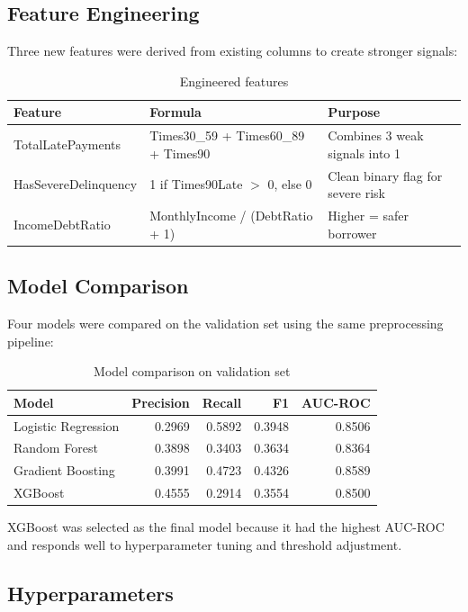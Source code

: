 \documentclass[12pt, a4paper]{article}
\begin{document}
\subsection{Feature Engineering}

Three new features were derived from existing columns to create stronger signals:

\begin{table}[H]
\centering
\begin{tabular}{lll}
\toprule
\textbf{Feature} & \textbf{Formula} & \textbf{Purpose} \\
\midrule
TotalLatePayments & Times30\_59 + Times60\_89 + Times90 & Combines 3 weak signals into 1 \\
HasSevereDelinquency & 1 if Times90Late $>$ 0, else 0 & Clean binary flag for severe risk \\
IncomeDebtRatio & MonthlyIncome / (DebtRatio + 1) & Higher = safer borrower \\
\bottomrule
\end{tabular}
\caption{Engineered features}
\end{table}

\subsection{Model Comparison}

Four models were compared on the validation set using the same preprocessing pipeline:

\begin{table}[H]
\centering
\begin{tabular}{lrrrr}
\toprule
\textbf{Model} & \textbf{Precision} & \textbf{Recall} & \textbf{F1} & \textbf{AUC-ROC} \\
\midrule
Logistic Regression & 0.2969 & 0.5892 & 0.3948 & 0.8506 \\
Random Forest & 0.3898 & 0.3403 & 0.3634 & 0.8364 \\
Gradient Boosting & 0.3991 & 0.4723 & 0.4326 & 0.8589 \\
XGBoost & 0.4555 & 0.2914 & 0.3554 & 0.8500 \\
\bottomrule
\end{tabular}
\caption{Model comparison on validation set}
\end{table}

XGBoost was selected as the final model because it had the highest AUC-ROC and responds well to hyperparameter tuning and threshold adjustment.

\subsection{Hyperparameters}
\end{document}
